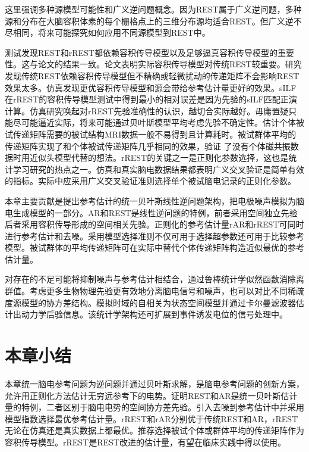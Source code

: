 这里强调多种源模型可能性和广义逆问题概念。因为REST属于广义逆问题，多种源和分布在大脑容积体素的每个栅格点上的三维分布源均适合REST。但广义逆不尽相同，将来可能探究如何应用不同源模型到REST中。

测试发现REST和rREST都依赖容积传导模型以及足够逼真容积传导模型的重要性。这与论文的结果一致。论文表明实际容积传导模型对传统REST较重要。研究发现传统REST依赖容积传导模型但不精确或轻微扰动的传递矩阵不会影响REST效果太多。仿真发现更优容积传导模型和源会带给参考估计量更好的效果。sILF在rREST的容积传导模型测试中得到最小的相对误差是因为先验的sILF匹配正演计算。仿真研究唤起对rREST先验准确性的认识，越切合实际越好。毋庸置疑只能尽可能逼近实际，将来可能通过贝叶斯模型平均考虑先验不确定性。估计个体被试传递矩阵需要的被试结构MRI数据一般不易得到且计算耗时。被试群体平均的传递矩阵实现了和个体被试传递矩阵几乎相同的效果，验证
了没有个体磁共振数据时用近似头模型代替的想法。rREST的关键之一是正则化参数选择，这也是统计学习研究的热点之一。仿真和真实脑电数据结果都表明广义交叉验证是简单有效的指标。实际中应采用广义交叉验证准则选择单个被试脑电记录的正则化参数。

本章主要贡献是提出参考估计的统一贝叶斯线性逆问题架构，把电极噪声模拟为脑电生成模型的一部分。AR和REST是线性逆问题的特例，前者采用空间独立先验后者采用容积传导形成的空间相关先验。正则化的参考估计量rAR和rREST可同时进行参考估计和去噪。采用模型选择准则不仅可用于选择超参数还可用于比较参考模型。被试群体的平均传递矩阵可在实际中替代个体传递矩阵构造近似最优的参考估计量。

对存在的不足可能将抑制噪声与参考估计相结合，通过鲁棒统计学似然函数消除离群值。考虑更多生物物理先验更有效地分离脑电信号和噪声，也可以对比不同稀疏度源模型的协方差结构。模拟时域的自相关为状态空间模型并通过卡尔曼滤波器估计出动力学后验信息。该统计学架构还可扩展到事件诱发电位的信号处理中。

\section{本章小结}
本章统一脑电参考问题为逆问题并通过贝叶斯求解，是脑电参考问题的创新方案，允许用正则化方法估计无穷远参考下的电势。证明REST和AR是统一贝叶斯估计量的特例，二者区别于脑电电势的空间协方差先验。引入去噪到参考估计中并采用模型指数选择最优参考估计量。rREST和rAR分别优于传统REST和AR，rREST无论在仿真还是真实数据上都最优。推荐选择被试个体或群体平均的传递矩阵作为容积传导模型。rREST是REST改进的估计量，有望在临床实践中得以使用。